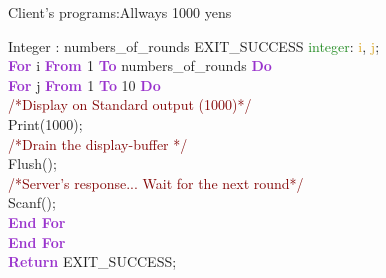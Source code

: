 \documentclass[11pt]{sample}
\renewcommand{\algorithmicdo}      {\textcolor{DarkOrchid}{\textbf{Do}}}
\renewcommand{\algorithmicfor}     {\textbf{\textcolor{DarkOrchid}{For}}}
\renewcommand{\algorithmicdo}      {\textbf{\textcolor{DarkOrchid}{Do}}}
\renewcommand{\algorithmicendfor}  {\textbf{\textcolor{DarkOrchid}{End For}}}
\begin{document}
\begin{algorithm}
  \caption{Client's programs:Allways 1000 yens}
  \begin{algorithmic}
    \REQUIRE Integer : numbers\_of\_rounds
    \ENSURE EXIT\_SUCCESS
    \vspace{2mm}
    \STATE \textcolor{ForestGreen}{integer}: \textcolor{Goldenrod}{i}, \textcolor{Goldenrod}{j};\\
    \algorithmicfor{ i  \textbf{\textcolor{DarkOrchid}{ From }} 1  \textbf{\textcolor{DarkOrchid}{To}} numbers\_of\_rounds} 
    \algorithmicdo \\
    \hspace{4mm}\algorithmicfor{ j \textbf{\textcolor{DarkOrchid}{ From }} 1  \textbf{\textcolor{DarkOrchid}{To}} 10} 
    \algorithmicdo \\
    \hspace{8mm}
    \textcolor{Maroon}{/*Display on Standard output (1000)*/}\\    \hspace{8mm}
    Print(1000);\\    \hspace{8mm}
    \textcolor{Maroon}{/*Drain the display-buffer */}\\    \hspace{8mm}
    Flush();\\    \hspace{8mm}
    \textcolor{Maroon}{/*Server's response... Wait for the next round*/}\\    \hspace{8mm}
    Scanf();\\
    \hspace{4mm}\algorithmicendfor\\
    \algorithmicendfor\\
    \STATE \textbf{\textcolor{DarkOrchid}{Return}} EXIT\_SUCCESS;
  \end{algorithmic}
\end{algorithm}
\newpage
\end{document}
